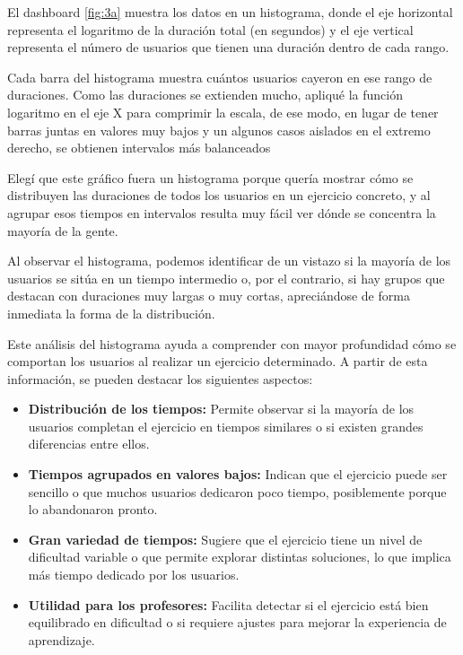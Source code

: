 \documentclass[a4paper, 12pt]{book}
\begin{document}
El dashboard \ref{fig:3a} muestra los datos en un histograma, donde el eje horizontal representa el logaritmo de la duración total (en segundos) y el eje vertical representa el número de usuarios que tienen una duración dentro de cada rango.

Cada barra del histograma muestra cuántos usuarios cayeron en ese rango de duraciones. Como las duraciones se extienden mucho, apliqué la función logaritmo en el eje X para comprimir la escala, de ese modo, en lugar de tener barras juntas en valores muy bajos y un algunos casos aislados en el extremo derecho, se obtienen intervalos más balanceados

Elegí que este gráfico fuera un histograma porque quería mostrar cómo se distribuyen las duraciones de todos los usuarios en un ejercicio concreto, y al agrupar esos tiempos en intervalos resulta muy fácil ver dónde se concentra la mayoría de la gente.

Al observar el histograma, podemos identificar de un vistazo si la mayoría de los usuarios se sitúa en un tiempo intermedio o, por el contrario, si hay grupos que destacan con duraciones muy largas o muy cortas, apreciándose de forma inmediata la forma de la distribución.

Este análisis del histograma ayuda a comprender con mayor profundidad cómo se comportan los usuarios al realizar un ejercicio determinado. A partir de esta información, se pueden destacar los siguientes aspectos:

\begin{itemize}
  \item \textbf{Distribución de los tiempos:} Permite observar si la mayoría de los usuarios completan el ejercicio en tiempos similares o si existen grandes diferencias entre ellos.

  \item \textbf{Tiempos agrupados en valores bajos:} Indican que el ejercicio puede ser sencillo o que muchos usuarios dedicaron poco tiempo, posiblemente porque lo abandonaron pronto.

  \item \textbf{Gran variedad de tiempos:} Sugiere que el ejercicio tiene un nivel de dificultad variable o que permite explorar distintas soluciones, lo que implica más tiempo dedicado por los usuarios.

  \item \textbf{Utilidad para los profesores:} Facilita detectar si el ejercicio está bien equilibrado en dificultad o si requiere ajustes para mejorar la experiencia de aprendizaje.
  
\end{itemize}
\end{document}
